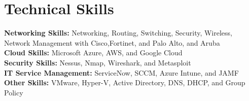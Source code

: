 
\section{Technical Skills}
 \begin{itemize}[leftmargin=0.15in, label={}]
    \small{\item{
      \textbf{\color{blue}Networking Skills: }{Networking, Routing, Switching, Security, Wireless, Network Management with Cisco,Fortinet, and Palo Alto, and Aruba} \\
      \vspace{2pt}
      \textbf{\color{blue}Cloud Skills: }{Microsoft Azure, AWS, and Google Cloud} \\
      \vspace{2pt}
      \textbf{\color{blue}Security Skills: }{Nessus, Nmap, Wireshark, and Metasploit} \\
      \vspace{2pt}
      \textbf{\color{blue} IT Service Management: }{ServiceNow, SCCM, Azure Intune, and JAMF} \\
      \vspace{2pt}
      \textbf{\color{blue}Other Skills: }{VMware, Hyper-V, Active Directory, DNS, DHCP, and Group Policy} \\
    }}

 \end{itemize}
